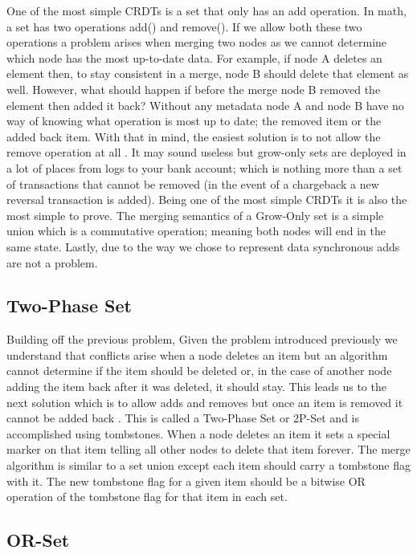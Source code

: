 \documentclass{article}
\begin{document}
\begin{multicols}{2}
\begin{refsection}
One of the most simple CRDTs is a set that only has an add operation. In
math, a set has two operations add() and remove(). If we allow both
these two operations a problem arises when merging two nodes as we
cannot determine which node has the most up-to-date data. For example,
if node A deletes an element then, to stay consistent in a merge, node B
should delete that element as well. However, what should happen if
before the merge node B removed the element then added it back? Without
any metadata node A and node B have no way of knowing what operation is
most up to date; the removed item or the added back item. With that in
mind, the easiest solution is to not allow the remove operation at all
\cite{shapiro_comprehensive_2011}. It may sound useless but grow-only
sets are deployed in a lot of places from logs to your bank account;
which is nothing more than a set of transactions that cannot be removed
(in the event of a chargeback a new reversal transaction is added).
Being one of the most simple CRDTs it is also the most simple to prove.
The merging semantics of a Grow-Only set is a simple union which is a
commutative operation; meaning both nodes will end in the same state.
Lastly, due to the way we chose to represent data synchronous adds are
not a problem.

\subsection*{Two-Phase Set}

Building off the previous problem, 
Given the problem introduced previously we understand that conflicts
arise when a node deletes an item but an algorithm cannot determine if
the item should be deleted or, in the case of another node adding the
item back after it was deleted, it should stay. This leads us to the
next solution which is to allow adds and removes but once an item is
removed it cannot be added back \cite{shapiro_comprehensive_2011}. This
is called a Two-Phase Set or 2P-Set and is accomplished using tombstones.
When a node deletes an item it sets a special marker on that item
telling all other nodes to delete that item forever. The merge algorithm
is similar to a set union except each item should carry a tombstone flag
with it. The new tombstone flag for a given item should be a bitwise OR
operation of the tombstone flag for that item in each set.

\subsection*{OR-Set}


\end{refsection}
\end{multicols}
\end{document}
